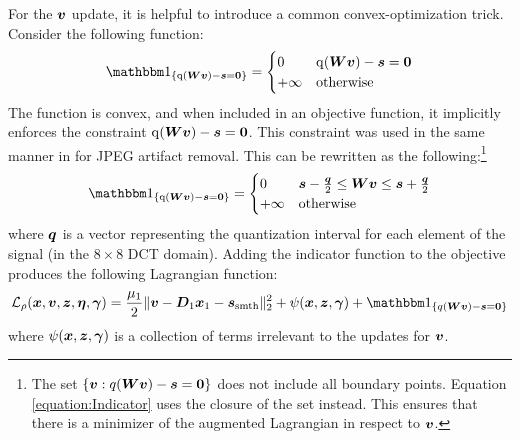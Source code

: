 For the $\bm{v}$ update, it is helpful to introduce a common convex-optimization trick. Consider the following function:
\begin{equation}
\indicator_{\{\operatorname{q}(\mW\vv) - \vs = \vzero\}} = \begin{cases} 0 & \operatorname{q}(\mW\vv) - \vs = \vzero \\ + \infty & \text{otherwise} \end{cases}
\end{equation}
%
The function is convex, and when included in an objective function, it implicitly enforces the constraint $\operatorname{q}(\bm{W}\bm{v}) - \bm{s} = \bm{0}$. This constraint was used in the same manner in \cite{sorel2016efficient} for JPEG artifact removal. This can be rewritten as the following:\footnote{The set $\{\bm{v}: q(\bm{W}\bm{v}) - \bm{s} = \bm{0}\}$ does not include all boundary points. Equation \ref{equation:Indicator} uses the closure of the set instead. This ensures that there is a minimizer of the augmented Lagrangian in respect to $\bm{v}$.} 
%
\begin{equation} \label{equation:Indicator}
\indicator_{\{\operatorname{q}(\mW\vv) - \vs = \vzero\}} = \begin{cases} 0 & \vs - \frac{\vq}{2} \leq \mW\vv \leq \vs + \frac{\vq}{2} \\ + \infty & \text{otherwise} \end{cases}
\end{equation}
%
where $\bm{q}$ is a vector representing the quantization interval for each element of the signal (in the $8 \times 8$ DCT domain). Adding the indicator function to the objective produces the following Lagrangian function: 
%
\begin{equation}
\begin{split}
\L_{\rho}(\vx,\vv,\vz,\veta,\vgamma) =  \frac{\mu_1}{2}\|\vv - \mD_1\vx_1  - \vs_{\text{smth}}\|_2^2 + \psi(\vx,\vz,\vgamma) + \indicator_{\{q(\mW\vv) - \vs = \vzero\}}
\end{split}
\end{equation}
%
where $\psi(\bm{x},\bm{z},\bm{\gamma})$ is a collection of terms irrelevant to the updates for $\bm{v}$.


